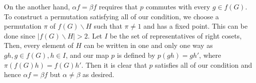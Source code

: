 On the another hand, $\alpha f=\beta f$ requires that $p$ commutes with every $g\in f(G)$. To construct a permutation satisfying all of our condition, we choose a permutation $\pi$ of $f(G)\backslash H$ such that $\pi\neq1$ and has a fixed point. This can be done since $|f(G)\backslash H|>2$.
Let $I$ be the set of representatives of right cosets, Then, every element of $H$ can be written in one and only one way as $gh, g\in f(G),h\in I$, and our map $p$ is defined by $p(gh)=gh'$, where $\pi (f(G)h)=f(G)h'$. Then it is clear that $p$ satisfies all of our condition and hence $\alpha f=\beta f$ but $\alpha\neq\beta$ as desired.
